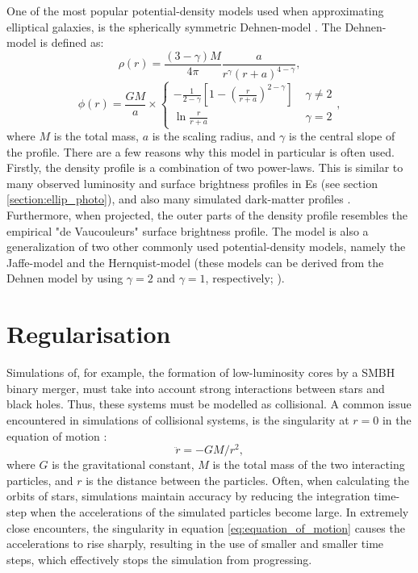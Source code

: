 \documentclass[english, twoside]{HYgradu}
\begin{document}
One of the most popular potential-density models used when approximating elliptical galaxies, is the spherically symmetric Dehnen-model \citep{Dehnen1993}. The Dehnen-model is defined as:
\begin{equation}
\rho(r) = \frac{(3-\gamma)M}{4\pi} \frac{a}{r^\gamma (r+a)^{4-\gamma}}, \label{eq:dehnen_density}
\end{equation}
\begin{equation}
\phi(r) = \frac{GM}{a} \times 
\begin{cases}
	-\frac{1}{2-\gamma} \left[ 1 - \left( \frac{r}{r+a} \right)^{2-\gamma} \right] & \; \gamma \neq 2 \\
	\ln \frac{r}{r+a}	 & \; \gamma = 2
\end{cases},
\label{eq:dehnen_potential}
\end{equation}
where $M$ is the total mass, $a$ is the scaling radius, and $\gamma$ is the central slope of the profile. There are a few reasons why this model in particular is often used. Firstly, the density profile is a combination of two power-laws. This is similar to many observed luminosity and surface brightness profiles in Es (see section \ref{section:ellip_photo}), and also many simulated dark-matter profiles \citep{BinneyTremaine}. Furthermore, when projected, the outer parts of the density profile resembles the empirical "de Vaucouleurs" surface brightness profile. The model is also a generalization of two other commonly used potential-density models, namely the Jaffe-model and the Hernquist-model (these models can be derived from the Dehnen model by using $\gamma = 2$ and $\gamma = 1$, respectively; \citealt{Jaffe1983, Hernquist1990}). 

\section{Regularisation} \label{section:regularisation}

Simulations of, for example, the formation of low-luminosity cores by a SMBH binary merger, must take into account strong interactions between stars and black holes. Thus, these systems must be modelled as collisional. A common issue encountered in simulations of collisional systems, is the singularity at $r=0$ in the equation of motion \citep{BinneyTremaine}:
\begin{equation}
\ddot{r} = -GM/r^2, \label{eq:equation_of_motion}
\end{equation}
where $G$ is the gravitational constant, $M$ is the total mass of the two interacting particles, and $r$ is the distance between the particles. Often, when calculating the orbits of stars, simulations maintain accuracy by reducing the integration time-step when the accelerations of the simulated particles become large. In extremely close encounters, the singularity in equation \ref{eq:equation_of_motion} causes the accelerations to rise sharply, resulting in the use of smaller and smaller time steps, which effectively stops the simulation from progressing. 
\end{document}
